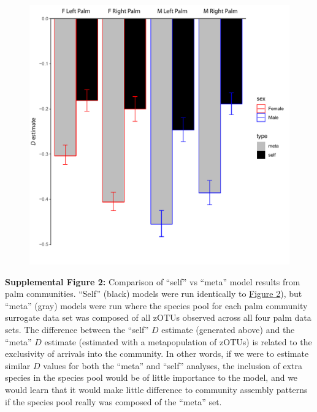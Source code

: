 \documentclass{article}
\begin{document}
{\begin{figure}[t]
	\centering
	\includegraphics[scale=0.80]{figs/Fig_S2.pdf}
\end{figure}
\textbf{Supplemental Figure 2:}\label{sec:figureS2} Comparison of “self” vs “meta” model results from palm communities. “Self” (black) models were run identically to \hyperref[sec:figure2]{Figure 2}), but “meta” (gray) models were run where the species pool for each palm community surrogate data set was composed of all zOTUs observed across all four palm data sets. The difference between the “self” \(D\) estimate (generated above) and the “meta” \(D\) estimate (estimated with a metapopulation of zOTUs) is related to the exclusivity of arrivals into the community. In other words, if we were to estimate similar \(D\) values for both the “meta” and “self” analyses, the inclusion of extra species in the species pool would be of little importance to the model, and we would learn that it would make little difference to community assembly patterns if the species pool really was composed of the “meta” set.
\newpage

}
\end{document}
